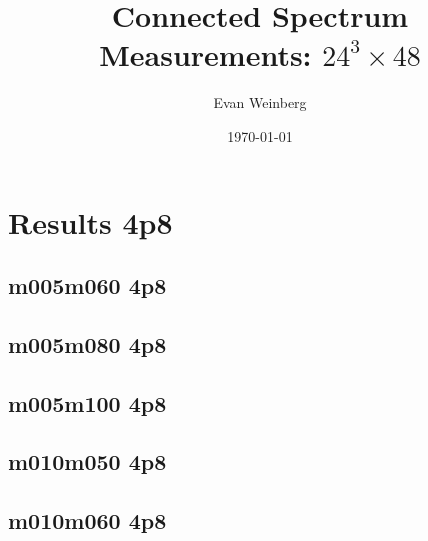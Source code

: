 \documentclass[pdftex,letterpaper,10pt]{article}
\begin{document}
\title{Connected Spectrum Measurements: $24^3 \times 48$}
\author{Evan Weinberg}
\date{\today}
\maketitle

\tableofcontents

\clearpage



\clearpage

\section{Results 4p8}

\subsection{m005m060 4p8}



\clearpage \subsection{m005m080 4p8}



\clearpage \subsection{m005m100 4p8}



\clearpage \subsection{m010m050 4p8}



\clearpage \subsection{m010m060 4p8}
\end{document}
